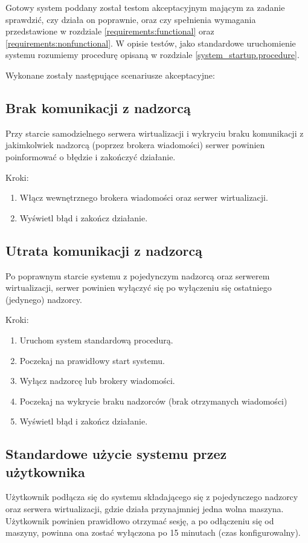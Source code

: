 \documentclass[../analiza-rozwiazania.tex]{subfiles}
\begin{document}
Gotowy system poddany został testom akceptacyjnym mającym za zadanie sprawdzić, czy działa on poprawnie, oraz czy spełnienia wymagania przedstawione w rozdziale \ref{requirements:functional} oraz \ref{requirements:nonfunctional}.
W opisie testów, jako standardowe uruchomienie systemu rozumiemy procedurę opisaną w rozdziale \ref{system_startup.procedure}.

Wykonane zostały następujące scenariusze akceptacyjne:

\subsection{Brak komunikacji z nadzorcą}
Przy starcie samodzielnego serwera wirtualizacji i wykryciu braku komunikacji z jakimkolwiek nadzorcą (poprzez brokera wiadomości) serwer powinien poinformować o błędzie i zakończyć działanie.

Kroki:
\begin{enumerate}
  \item Włącz wewnętrznego brokera wiadomości oraz serwer wirtualizacji.
  \item Wyświetl błąd i zakończ działanie.
\end{enumerate}

\subsection{Utrata komunikacji z nadzorcą}
Po poprawnym starcie systemu z pojedynczym nadzorcą oraz serwerem wirtualizacji, serwer powinien wyłączyć się po wyłączeniu się ostatniego (jedynego) nadzorcy.

Kroki:
\begin{enumerate}
  \item Uruchom system standardową procedurą.
  \item Poczekaj na prawidłowy start systemu.
  \item Wyłącz nadzorcę lub brokery wiadomości.
  \item Poczekaj na wykrycie braku nadzorców (brak otrzymanych wiadomości)
  \item Wyświetl błąd i zakończ działanie.
\end{enumerate}

\subsection{Standardowe użycie systemu przez użytkownika}
Użytkownik podłącza się do systemu składającego się z pojedynczego nadzorcy oraz serwera wirtualizacji, gdzie działa przynajmniej jedna wolna maszyna.
Użytkownik powinien prawidłowo otrzymać sesję, a po odłączeniu się od maszyny, powinna ona zostać wyłączona po 15 minutach (czas konfigurowalny).
\end{document}
